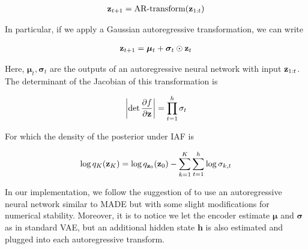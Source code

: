 \documentclass[12pt]{article}
\begin{document}
\begin{align}
    \textbf{z}_{t+1} = \text{AR-transform}(\textbf{z}_{1:t})
\end{align}

In particular, if we apply a Gaussian autoregressive transformation, we can write

\begin{align}
    \textbf{z}_{t+1} = \boldsymbol{\mu}_t + \boldsymbol{\sigma}_t \odot \textbf{z}_t
\end{align}

Here, \(\boldsymbol{\mu}_t, \boldsymbol{\sigma}_t\) are the outputs of an autoregressive neural network with input \(\textbf{z}_{1:t}\). The determinant of the Jacobian of this transformation is

\begin{equation}
    \left| \det \frac{\partial f}{\partial \textbf{z}} \right| = \prod_{t=1}^h \sigma_t
\end{equation}

For which the density of the posterior under IAF is

\begin{equation}
    \log q_K(\textbf{z}_K) = \log q_{\textbf{z}_0}(\textbf{z}_0) - \sum_{k=1}^K \sum_{t=1}^h \log \sigma_{k,t}
\end{equation}

In our implementation, we follow the suggestion of \cite{Kingma2016ImprovedVI} to use an autoregressive neural network similar to MADE \cite{pmlr-v37-germain15} but with some slight modifications for numerical stability.
Moreover, it is to notice we let the encoder estimate \(\boldsymbol{\mu}\) and \(\boldsymbol{\sigma}\) as in standard VAE, but an additional hidden state \(\mathbf{h}\) is also estimated and plugged into each autoregressive transform. 




\end{document}
